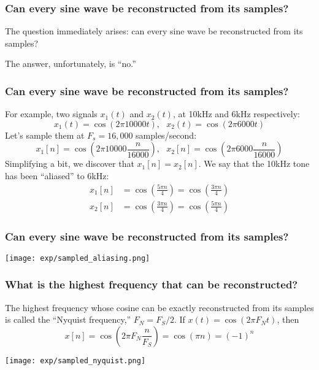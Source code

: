 \documentclass{beamer}
\begin{document}
\begin{frame}
  \frametitle{Can every  sine wave be reconstructed from its samples?}

  The question immediately arises: can every sine wave be reconstructed from its samples?

  The answer, unfortunately, is ``no.''
\end{frame}
\begin{frame}
  \frametitle{Can every  sine wave be reconstructed from its samples?}
  
  For example, two signals $x_1(t)$ and $x_2(t)$, at 10kHz and 6kHz respectively:
  \begin{displaymath}
    x_1(t)=\cos(2\pi 10000t),~~~x_2(t)=\cos(2\pi 6000t)
  \end{displaymath}
  Let's sample them at $F_s=16,000$ samples/second:
  \begin{displaymath}
    x_1[n]=\cos\left(2\pi 10000\frac{n}{16000}\right),~~~x_2[n]=\cos\left(2\pi 6000\frac{n}{16000}\right)
  \end{displaymath}
  Simplifying a bit, we discover that $x_1[n]=x_2[n]$.  We say that
  the 10kHz tone has been ``aliased'' to 6kHz:
  \begin{align*}
    x_1[n]&=\cos\left(\frac{5\pi n}{4}\right)=\cos\left(\frac{3\pi n}{4}\right)\\
    x_2[n]&=\cos\left(\frac{3\pi n}{4}\right)=\cos\left(\frac{5\pi n}{4}\right)
  \end{align*}
\end{frame}

\begin{frame}
  \frametitle{Can every  sine wave be reconstructed from its samples?}

  \centerline{\texttt{[image: exp/sampled\_aliasing.png]}}
\end{frame}

\begin{frame}
  \frametitle{What is the highest frequency that can be reconstructed?}

  The highest frequency whose cosine can be exactly reconstructed from
  its samples is called the ``Nyquist frequency,'' $F_N=F_S/2$.  If
  $x(t)=\cos(2\pi F_Nt)$, then
  \begin{displaymath}
    x[n]=\cos\left(2\pi F_N\frac{n}{F_S}\right)=\cos(\pi n)=(-1)^n
  \end{displaymath}

  \centerline{\texttt{[image: exp/sampled\_nyquist.png]}}
\end{frame}
\end{document}
